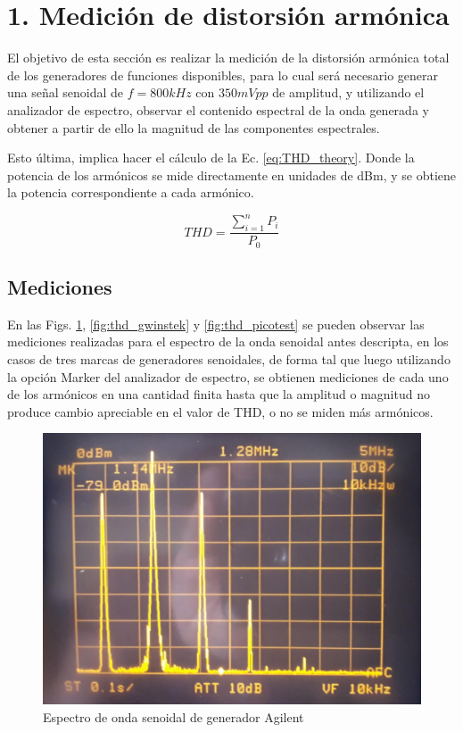 \section{1. Medici\'on de distorsi\'on arm\'onica}
El objetivo de esta secci\'on es realizar la medici\'on de la distorsi\'on arm\'onica total de los generadores de funciones
disponibles, para lo cual ser\'a necesario generar una se\~nal senoidal de $f = 800kHz$ con $350mVpp$ de amplitud, y utilizando el
analizador de espectro, observar el contenido espectral de la onda generada y obtener a partir de ello la magnitud de las componentes
espectrales. 

Esto \'ultima, implica hacer el c\'alculo de la Ec. \ref{eq:THD_theory}. Donde la potencia de los arm\'onicos se mide directamente
en unidades de dBm, y se obtiene la potencia correspondiente a cada arm\'onico.

\begin{equation}
    THD = \frac{ \sum_{i = 1}^{n} P_i }{P_0}
    \label{eq:THD_theory}
\end{equation}


\subsection{Mediciones}
En las Figs. \ref{fig:thd_agilent}, \ref{fig:thd_gwinstek} y \ref{fig:thd_picotest} se pueden observar
las mediciones realizadas para el espectro de la onda senoidal antes descripta, en los casos de tres marcas de generadores senoidales,
de forma tal que luego utilizando la opci\'on Marker del analizador de espectro, se obtienen mediciones de cada uno de los arm\'onicos
en una cantidad finita hasta que la amplitud o magnitud no produce cambio apreciable en el valor de THD, o no se miden m\'as arm\'onicos.

\begin{figure}[H]
    \centering
    \includegraphics[scale=0.2]{../Mediciones/Ejercicio_1/generador_agilent.jpeg}
    \caption{Espectro de onda senoidal de generador Agilent}
    \label{fig:thd_agilent}
\end{figure}

